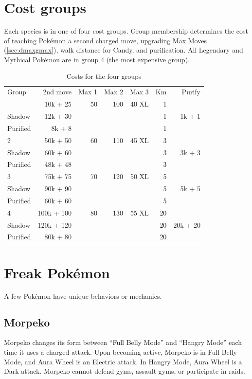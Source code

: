 \section{Cost groups}
\label{sec:costgroups}
Each species is in one of four cost groups.
Group membership determines the cost of teaching Pokémon a second charged move,
  upgrading Max Moves (\autoref{sec:dmaxgmax}),
  walk distance for Candy,
  and purification.
All Legendary and Mythical Pokémon are in group 4 (the most expensive group).
\begin{table}
\centering
\begin{tabular}{lrrrrrr}
  Group & 2nd move   & Max 1 & Max 2 & Max 3 & Km & Purify\\
\Midrule
      1 & 10k + 25   & 50    & 100   & 40 XL & 1  &       \\
  Shadow& 12k + 30   &       &       &       & 1  & 1k + 1\\
Purified& 8k + 8   &       &       &       & 1  &         \\
      2 & 50k + 50   & 60    & 110   & 45 XL & 3  &       \\
  Shadow& 60k + 60   &       &       &       & 3  & 3k + 3\\
  Purified& 48k + 48   &       &       &       & 3  &     \\
      3 & 75k + 75   & 70    & 120   & 50 XL & 5  &       \\
  Shadow& 90k + 90   &       &       &       & 5  & 5k + 5\\
  Purified & 60k + 60 &   &    &   & 5 &                  \\
      4 & 100k + 100 & 80    & 130   & 55 XL & 20 &       \\
  Shadow& 120k + 120 &       &       &       & 20 & 20k + 20\\
Purified& 80k + 80 &   &    &   & 20 & \\
\end{tabular}
\caption{Costs for the four groups}
\label{table:costs}
\end{table}

\section{Freak Pokémon}
\label{sec:freaks}
A few Pokémon have unique behaviors or mechanics.

\subsection{Morpeko}
\label{subsec:morpeko}
Morpeko changes its form between ``Full Belly Mode'' and ``Hangry Mode''
  each time it uses a charged attack.
Upon becoming active, Morpeko is in Full Belly Mode, and Aura Wheel is an Electric attack.
In Hangry Mode, Aura Wheel is a Dark attack.
Morpeko cannot defend gyms, assault gyms, or participate in raids.

